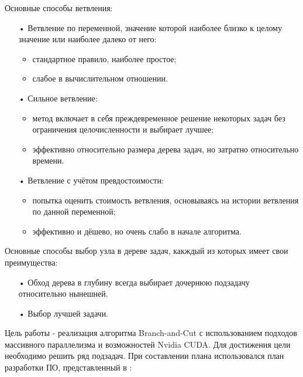 \documentclass[a4paper,14pt,russian]{extreport}
\begin{document}
\par
Основные способы ветвления:
\begin{itemize}
\item[•] Ветвление по переменной, значение которой наиболее близко к целому значение или наиболее далеко от него:
\begin{itemize}
\item стандартное правило, наиболее простое;
\item слабое в вычислительном отношении.
\end{itemize}
\item[•] Сильное ветвление:
\begin{itemize} 
\item метод включает в себя преждевременное решение некоторых задач без ограничения целочисленности и выбирает лучшее;
\item эффективно относительно размера дерева задач, но затратно относительно времени.
\end{itemize}
\item[•] Ветвление с учётом превдостоимости:
\begin{itemize}
\item попытка оценить стоимость ветвления, основываясь на истории ветвления по данной переменной;
\item эффективно и дёшево, но очень слабо в начале алгоритма.
\end{itemize}
\end{itemize}
\par
Основные способы выбор узла в дереве задач, какждый из которых имеет свои преимущества:
\begin{itemize}
\item[•] Обход дерева в глубину \cite{dakin} всегда выбирает дочернюю подзадачу относительно нынешней.
\item[•] Выбор лучшей задачи.
\end{itemize}
\par 
Цель работы - реализация алгоритма Branch-and-Cut с использованием подходов массивного параллелизма и возможностей Nvidia CUDA. Для достижения цели необходимо решить ряд подзадач. При составлении плана использовался план разработки ПО, представленный в \cite{mcconnell}: 
\end{document}
